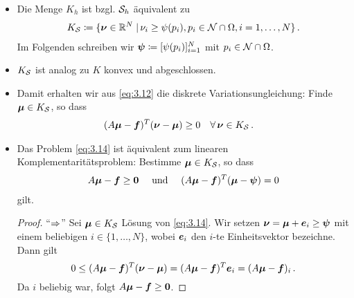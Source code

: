 \begin{itemize}
\item Die Menge $K_h$ ist bzgl. $\mathcal S_h$ äquivalent zu
\begin{align}\label{eq:3.13}
	K_{\mathcal S} \coloneqq \{\boldsymbol \nu \in \mathbb{R}^N \;\vert\, \nu_i \ge \psi(p_i) , p_i \in \mathcal N \cap \Omega, i = 1,\ldots, N \} \, .
\end{align}
Im Folgenden schreiben wir $\boldsymbol \psi \coloneqq [\psi(p_i)]_{i=1}^N$ mit $p_i \in \mathcal N\cap \Omega$.

\item \begin{bem*}
$K_{\mathcal S}$ ist analog zu $K$ konvex und abgeschlossen.
\end{bem*}

\item Damit erhalten wir aus \eqref{eq:3.12} die diskrete Variationsungleichung: Finde $\boldsymbol\mu \in K_{\mathcal S}$, so dass
\begin{align}\label{eq:3.14}
	(A\boldsymbol \mu-\boldsymbol f)^T (\boldsymbol \nu- \boldsymbol\mu) &  \ge 0 \quad \forall \, \boldsymbol \nu \in K_{\mathcal S} \, .
\end{align}

\item \begin{satz}\label{satz:3.10}
Das Problem \eqref{eq:3.14} ist äquivalent zum linearen Komplementaritätsproblem: Bestimme $\boldsymbol\mu \in K_{\mathcal S}$, so dass
\begin{align}\label{eq:3.15}
	A\boldsymbol\mu - \boldsymbol f \ge \boldsymbol 0\quad\text{ und }\quad (A\boldsymbol\mu-\boldsymbol f)^T(\boldsymbol \mu - \boldsymbol\psi) = 0
\end{align}
gilt.
\end{satz}

\begin{proof}
"`$\Rightarrow$"' Sei $\boldsymbol \mu \in K_{\mathcal S}$ Lösung von \eqref{eq:3.14}. Wir setzen $\boldsymbol\nu = \boldsymbol \mu +\boldsymbol e_i \ge \boldsymbol\psi$ mit einem beliebigen $i \in \{1,\ldots,N\}$, wobei $\boldsymbol e_i $ den $i$-te Einheitsvektor bezeichne. Dann gilt
\[
	0 \le (A\boldsymbol\mu - \boldsymbol f)^T (\boldsymbol\nu - \boldsymbol\mu) = (A\boldsymbol\mu - \boldsymbol f)^T \boldsymbol e_i = (A\boldsymbol \mu-\boldsymbol f)_i \, .
\]
Da $i$ beliebig war, folgt $A\boldsymbol\mu - \boldsymbol f\ge \boldsymbol 0$.


\end{proof}
\end{itemize}
